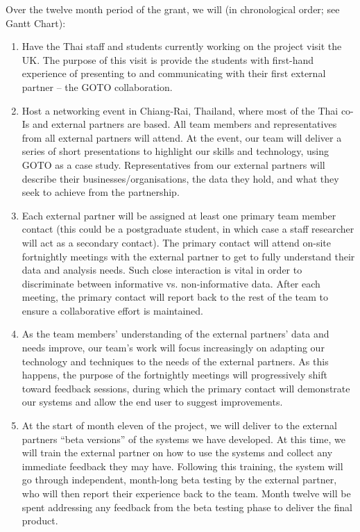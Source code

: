 \documentclass[11pt]{article}
\begin{document}
  \noindent
  Over the twelve month period of the grant, we will (in chronological order; see Gantt Chart):
  \begin{enumerate}[leftmargin=6mm,itemsep=0pt,topsep=1pt]
  \item Have the Thai staff and students currently working on the project visit the UK. The purpose of this visit is provide the students with first-hand experience of presenting to and communicating with their first external partner -- the GOTO collaboration.
  \item Host a networking event in Chiang-Rai, Thailand, where most of the Thai co-Is and external partners are based. All team members and representatives from all external partners will attend. At the event, our team will deliver a series of short presentations to highlight our skills and technology, using GOTO as a case study. Representatives from our external partners will describe their businesses/organisations, the data they hold, and what they seek to achieve from the partnership.  
  \item Each external partner will be assigned at least one primary team member contact (this could be a postgraduate student, in which case a staff researcher will act as a secondary contact). The primary contact will attend on-site fortnightly meetings with the external partner to get to fully understand their data and analysis needs. Such close interaction is vital in order to discriminate between informative vs. non-informative data. After each meeting, the primary contact will report back to the rest of the team to ensure a collaborative effort is maintained.
  \item As the team members' understanding of the external partners' data and needs improve, our team's work will focus increasingly on adapting our technology and techniques to the needs of the external partners. As this happens, the purpose of the fortnightly meetings will progressively shift toward feedback sessions, during which the primary contact will demonstrate our systems and allow the end user to suggest improvements. 
  \item At the start of month eleven of the project, we will deliver to the external partners ``beta versions'' of the systems we have developed. At this time, we will train the external partner on how to use the systems and collect any immediate feedback they may have. Following this training, the system will go through independent, month-long beta testing by the external partner, who will then report their experience back to the team. Month twelve will be spent addressing any feedback from the beta testing phase to deliver the final product.
  \end{enumerate}
  
\end{document}
